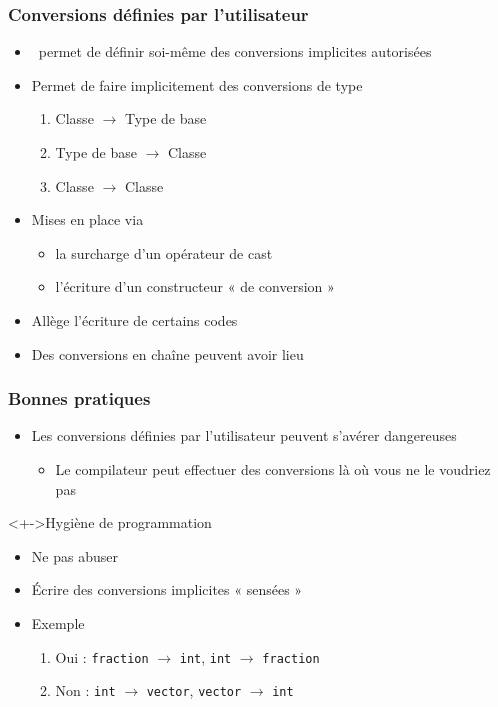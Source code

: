 \begin{frame}
\frametitle{Conversions définies par l'utilisateur}
\begin{itemize}[<+->]
\item \cpp\ permet de définir soi-même des conversions implicites autorisées
\item Permet de faire implicitement des conversions de type
	\begin{enumerate}
	\item Classe $\rightarrow$ Type de base
	\item Type de base $\rightarrow$ Classe
	\item Classe $\rightarrow$ Classe
	\end{enumerate}
\item Mises en place via
	\begin{itemize}
	\item la surcharge d'un opérateur de cast
	\item l'écriture d'un constructeur « de conversion »
	\end{itemize}
\item Allège l'écriture de certains codes
\item Des conversions en chaîne peuvent avoir lieu
\end{itemize}
\end{frame}

\begin{frame}
\frametitle{Bonnes pratiques}
\begin{itemize}[<+->]
\item Les conversions définies par l'utilisateur peuvent s'avérer dangereuses
	\begin{itemize}[<+->]
	\item Le compilateur peut effectuer des conversions là où vous ne le voudriez pas
	\end{itemize}
\end{itemize}
\begin{block}<+->{Hygiène de programmation}
	\begin{itemize}[<+->]
	\item Ne pas abuser
	\item Écrire des conversions implicites « sensées »
	\end{itemize}
\end{block}
\begin{itemize}[<+->]
\item Exemple
	\begin{enumerate}[<+->]
	\item Oui : \texttt{fraction} $\rightarrow$ \lstinline|int|, \lstinline|int| $\rightarrow$ \texttt{fraction}
	\item Non : \lstinline|int| $\rightarrow$ \texttt{vector}, \texttt{vector} $\rightarrow$ \lstinline|int|
	\end{enumerate}
\end{itemize}
\end{frame}

